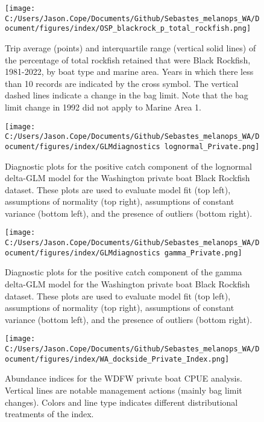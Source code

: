 \documentclass[11pt,
  english,
  letterpaper,
]{article}
\begin{document}
\pagebreak

\begin{figure}
\centering
\texttt{[image: C:/Users/Jason.Cope/Documents/Github/Sebastes\_melanops\_WA/Document/figures/index/OSP\_blackrock\_p\_total\_rockfish.png]}
\caption{Trip average (points) and interquartile range (vertical solid lines) of the percentage of total rockfish retained that were Black Rockfish, 1981-2022, by boat type and marine area. Years in which there less than 10 records are indicated by the cross symbol. The vertical dashed lines indicate a change in the bag limit. Note that the bag limit change in 1992 did not apply to Marine Area 1.\label{fig:blackrock_percentage}}
\end{figure}

\pagebreak

\begin{figure}
\centering
\texttt{[image: C:/Users/Jason.Cope/Documents/Github/Sebastes\_melanops\_WA/Document/figures/index/GLMdiagnostics lognormal\_Private.png]}
\caption{Diagnostic plots for the positive catch component of the lognormal delta-GLM model for the Washington private boat Black Rockfish dataset. These plots are used to evaluate model fit (top left), assumptions of normality (top right), assumptions of constant variance (bottom left), and the presence of outliers (bottom right).\label{fig:private-log-diags}}
\end{figure}

\pagebreak

\begin{figure}
\centering
\texttt{[image: C:/Users/Jason.Cope/Documents/Github/Sebastes\_melanops\_WA/Document/figures/index/GLMdiagnostics gamma\_Private.png]}
\caption{Diagnostic plots for the positive catch component of the gamma delta-GLM model for the Washington private boat Black Rockfish dataset. These plots are used to evaluate model fit (top left), assumptions of normality (top right), assumptions of constant variance (bottom left), and the presence of outliers (bottom right).\label{fig:private-gam-diags}}
\end{figure}

\pagebreak

\begin{figure}
\centering
\texttt{[image: C:/Users/Jason.Cope/Documents/Github/Sebastes\_melanops\_WA/Document/figures/index/WA\_dockside\_Private\_Index.png]}
\caption{Abundance indices for the WDFW private boat CPUE analysis. Vertical lines are notable management actions (mainly bag limit changes). Colors and line type indicates different distributional treatments of the index.\label{fig:private-index}}
\end{figure}
\end{document}
